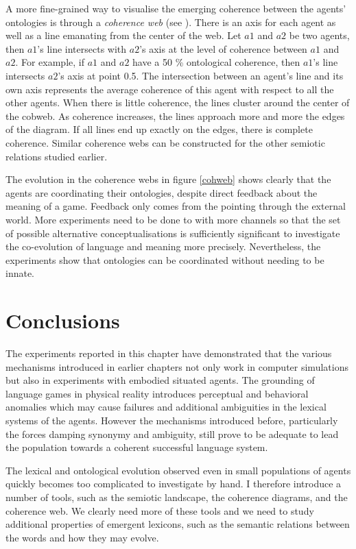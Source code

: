 A more fine-grained way to visualise the emerging
coherence between the agents' ontologies is 
through a {\itshape coherence web} (see ). 
There is an axis for each agent as well as
a line emanating from the center of the web.
Let $a1$ and $a2$ be two 
agents, then $a1$'s line intersects with $a2$'s axis at the 
level of coherence between $a1$ and $a2$. For example, if $a1$
and $a2$ have a 50 \% ontological coherence, then $a1$'s
line intersects $a2$'s axis at point 0.5. The intersection between 
an agent's line and its own axis represents the average 
coherence of this agent with respect to all the other
agents. When there is little 
coherence, the lines cluster around the center of the cobweb. 
As coherence increases, the lines approach more and more the edges
of the diagram. If all lines end up exactly
on the edges, there is complete coherence. Similar coherence
webs can be constructed for the other semiotic 
relations studied earlier.  

The evolution in the coherence webs in figure 
\ref{cohweb} shows clearly that the agents are 
coordinating their ontologies, despite direct feedback 
about the meaning of a game. Feedback only comes from 
the pointing through the external world. More experiments
need to be done to with more channels so that the 
set of possible alternative conceptualisations is 
sufficiently significant to investigate the co-evolution 
of language and meaning more precisely. Nevertheless, 
the experiments show that ontologies can be coordinated
without needing to be innate. 

\section{Conclusions}

The experiments reported in this chapter have
demonstrated that 
the various mechanisms introduced in earlier chapters
not only work in computer simulations but also in 
experiments with embodied situated agents. 
The grounding of language games in physical 
reality introduces perceptual and behavioral anomalies 
which may cause failures and additional ambiguities
in the lexical systems of the agents. However the 
mechanisms introduced before, particularly the 
forces damping synonymy and ambiguity, still prove to 
be adequate to lead the population towards a 
coherent successful language system. 

The lexical and ontological evolution observed even 
in small populations of agents quickly becomes 
too complicated to investigate by hand. I therefore
introduce a number of tools, such as the semiotic
landscape, the coherence diagrams, and the coherence
web. We clearly need more of these tools and we 
need to study additional properties of emergent 
lexicons, such as the semantic relations between 
the words and how they may evolve. 

